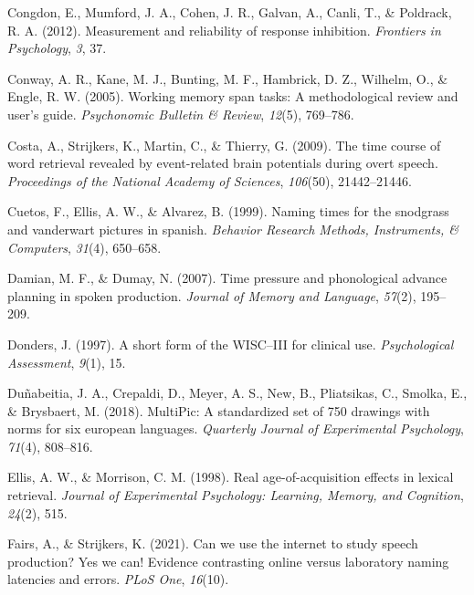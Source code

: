 \documentclass[
  man,floatsintext]{apa6}
\newlength{\cslhangindent}
\newlength{\cslentryspacingunit} %
\newenvironment{CSLReferences}[2] %
 {%
  \setlength{\parindent}{0pt}
  \ifodd #1
  \let\oldpar\par
  \def\par{\hangindent=\cslhangindent\oldpar}
  \fi
  \setlength{\parskip}{#2\cslentryspacingunit}
 }%
 {}
\begin{document}
\begin{CSLReferences}{1}{0}
\leavevmode{}%
Congdon, E., Mumford, J. A., Cohen, J. R., Galvan, A., Canli, T., \& Poldrack, R. A. (2012). Measurement and reliability of response inhibition. \emph{Frontiers in Psychology}, \emph{3}, 37.

\leavevmode{}%
Conway, A. R., Kane, M. J., Bunting, M. F., Hambrick, D. Z., Wilhelm, O., \& Engle, R. W. (2005). Working memory span tasks: A methodological review and user's guide. \emph{Psychonomic Bulletin \& Review}, \emph{12}(5), 769--786.

\leavevmode{}%
Costa, A., Strijkers, K., Martin, C., \& Thierry, G. (2009). The time course of word retrieval revealed by event-related brain potentials during overt speech. \emph{Proceedings of the National Academy of Sciences}, \emph{106}(50), 21442--21446.

\leavevmode{}%
Cuetos, F., Ellis, A. W., \& Alvarez, B. (1999). Naming times for the snodgrass and vanderwart pictures in spanish. \emph{Behavior Research Methods, Instruments, \& Computers}, \emph{31}(4), 650--658.

\leavevmode{}%
Damian, M. F., \& Dumay, N. (2007). Time pressure and phonological advance planning in spoken production. \emph{Journal of Memory and Language}, \emph{57}(2), 195--209.

\leavevmode{}%
Donders, J. (1997). A short form of the WISC--III for clinical use. \emph{Psychological Assessment}, \emph{9}(1), 15.

\leavevmode{}%
Duñabeitia, J. A., Crepaldi, D., Meyer, A. S., New, B., Pliatsikas, C., Smolka, E., \& Brysbaert, M. (2018). MultiPic: A standardized set of 750 drawings with norms for six european languages. \emph{Quarterly Journal of Experimental Psychology}, \emph{71}(4), 808--816.

\leavevmode{}%
Ellis, A. W., \& Morrison, C. M. (1998). Real age-of-acquisition effects in lexical retrieval. \emph{Journal of Experimental Psychology: Learning, Memory, and Cognition}, \emph{24}(2), 515.

\leavevmode{}%
Fairs, A., \& Strijkers, K. (2021). Can we use the internet to study speech production? Yes we can! Evidence contrasting online versus laboratory naming latencies and errors. \emph{PLoS One}, \emph{16}(10).


\end{CSLReferences}
\end{document}
